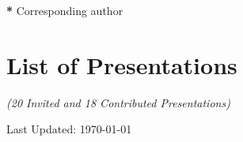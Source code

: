 \documentclass[10pt,a4paper,roman,]{moderncv} %
\begin{document}
 \begin{etaremune}[leftmargin=40pt,labelsep=10pt]

 
\end{etaremune}
\hspace*{\fill}\textbf{*} Corresponding author
 \begin{etaremune}[leftmargin=40pt,labelsep=10pt]
 
\end{etaremune} 

% 


% 




\clearpage
\section{List of Presentations}
\begin{center}
    \textit{(20 Invited and 18 Contributed Presentations)\\}
\end{center}

 
{}




\begin{center}
    Last Updated: \today
\end{center}
\end{document}
